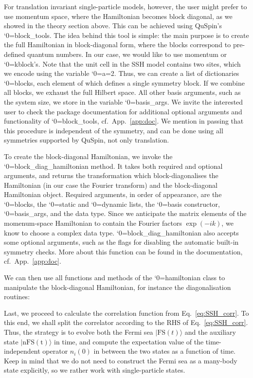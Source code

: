 \documentclass{SciPost}
\newcommand\0{\scalebox{-1}[1]{0}}
\let\svttfamily\ttfamily
\renewcommand\ttfamily{\svttfamily\catcode`0=\active }
\renewcommand\texttt{\bgroup\ttfamily\texttthelp}
\def\texttthelp#1{#1\egroup}
\newcommand{\SSHcode}{example5.py}
\begin{document}
For translation invariant single-particle models, however, the user might prefer to use momentum space, where the Hamiltonian becomes block diagonal, as we showed in the theory section above. This can be achieved using QuSpin's \texttt{block\_tools}. The idea behind this tool is simple: the main purpose is to create the full Hamiltonian in block-diagonal form, where the blocks correspond to pre-defined quantum numbers. In our case, we would like to use momentum or \texttt{kblock}'s. Note that the unit cell in the SSH model contains two sites, which we encode using the variable \texttt{a=2}. Thus, we can create a list of dictionaries \texttt{blocks}, each element of which defines a single symmetry block. If we combine all blocks, we exhaust the full Hilbert space. All other basis arguments, such as the system size, we store in the variable \texttt{basis\_args}. We invite the interested user to check the package documentation for additional optional arguments and functionality of \texttt{block\_tools}, cf.~App.~\ref{app:doc}. We mention in passing that this procedure is independent of the symmetry, and can be done using all symmetries supported by QuSpin, not only translation.

To create the block-diagonal Hamiltonian, we invoke the \texttt{block\_diag\_hamiltonian} method. It takes both required and optional arguments, and returns the transformation which block-diagonalises the Hamiltonian (in our case the Fourier transform) and the block-diagonal Hamiltonian object. Required arguments, in order of appearance, are the \texttt{blocks}, the \texttt{static} and \texttt{dynamic} lists, the \texttt{basis} constructor, \texttt{basis\_args}, and the data type. Since we anticipate the matrix elements of the momenum-space Hamiltonian to contain the Fourier factors $\exp(-ik)$, we know to choose a complex data type. \texttt{block\_diag\_hamiltonian} also accepts some optional arguments, such as the flags for disabling the automatic built-in symmetry checks. More about this function can be found in the documentation, cf.~App.~\ref{app:doc}.

We can then use all functions and methods of the \texttt{hamiltonian} class to manipulate the block-diagonal Hamiltonian, for instance the diagonalisation routines:


Last, we proceed to calculate the correlation function from Eq.~\eqref{eq:SSH_corr}. To this end, we shall split the correlator according to the RHS of Eq.~\eqref{eq:SSH_corr}. Thus, the strategy is to evolve both the Fermi sea $|\mathrm{FS}(t)\rangle$ and the auxiliary state $|\mathrm{nFS(t)}\rangle$ in time, and compute the expectation value of the time-independent operator $n_i(0)$ in between the two states as a function of time. Keep in mind that we do not need to construct the Fermi sea as a many-body state explicitly, so we rather work with single-particle states.
\end{document}
